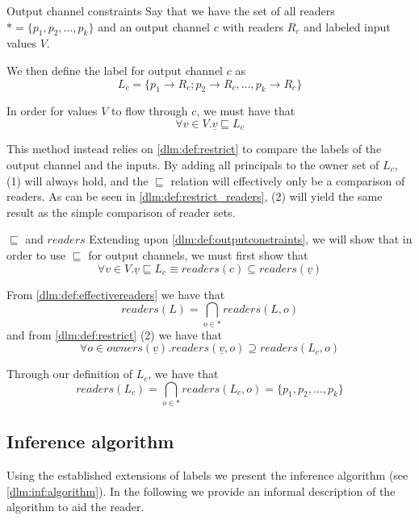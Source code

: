 \begin{definition}{Output channel constraints}\label{dlm:def:outputconstraints}
Say that we have the set of all readers $ * = \{p_1, p_2, \dots, p_k\} $ and an output channel $c$ with readers $R_c$ and labeled input values $V$.

We then define the label for output channel $c$ as
\[ L_c = \{ p_1 \rightarrow R_c; p_2 \rightarrow R_c, \dots, p_k \rightarrow R_c \} \]

In order for values $V$ to flow through $c$, we must have that
\[ \forall v \in V.\underline{v} \sqsubseteq L_c \]
\end{definition}

This method instead relies on \cref{dlm:def:restrict} to compare the labels of the output channel and the inputs.
By adding all principals to the owner set of $L_c$, (1) will always hold, and the $\sqsubseteq$ relation will effectively only be a comparison of readers.
As can be seen in \cref{dlm:def:restrict_readers}, (2) will yield the same result as the simple comparison of reader sets.

\begin{definition}{$\sqsubseteq$ and $readers$}\label{dlm:def:restrict_readers}
Extending upon \cref{dlm:def:outputconstraints}, we will show that in order to use $\sqsubseteq$ for output channels, we must first show that
\[ \forall v \in V . \underline{v} \sqsubseteq L_c \equiv readers(c) \subseteq readers(\underline{v}) \]

From \cref{dlm:def:effectivereaders} we have that
\[ readers(L) = \bigcap_{o \in *} readers(L, o) \]
and from \cref{dlm:def:restrict} (2) we have that
\[ \forall o \in owners(\underline{v}) . readers(\underline{v}, o) \supseteq readers(L_c, o) \]

Through our definition of $L_c$, we have that
\[ readers(L_c) = \bigcap\limits_{o \in *} readers(L_c, o) = \{p_1, p_2, \dots, p_k\} \]

\end{definition}

\subsection{Inference algorithm}\label{dlm:inf:algsection}
Using the established extensions of labels we present the inference algorithm (see \cref{dlm:inf:algorithm}).
In the following we provide an informal description of the algorithm to aid the reader.

